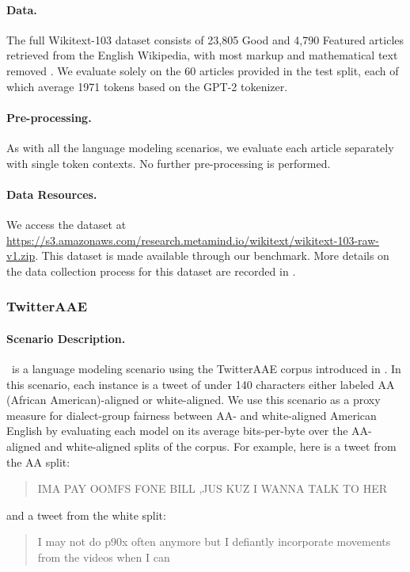 \paragraph{Data.}
The full Wikitext-103 dataset consists of 23,805 Good and 4,790 Featured articles retrieved from the English Wikipedia, with most markup and mathematical text removed \citep{merity2016pointer}. We evaluate solely on the 60 articles provided in the test split, each of which average 1971 tokens based on the GPT-2 tokenizer.

\paragraph{Pre-processing.}
As with all the language modeling scenarios, we evaluate each article separately with single token contexts. No further pre-processing is performed.

\paragraph{Data Resources.} We access the dataset at \url{https://s3.amazonaws.com/research.metamind.io/wikitext/wikitext-103-raw-v1.zip}. This dataset is made available through our benchmark. More details on the data collection process for this dataset are recorded in \citet{merity2016pointer}.

\subsubsection{TwitterAAE}
\paragraph{Scenario Description.} \twitteraae~is a language modeling scenario using the TwitterAAE corpus introduced in \citet{blodgett2016}. In this scenario, each instance is a tweet of under 140 characters either labeled AA (African American)-aligned or white-aligned. We use this scenario as a proxy measure for dialect-group fairness between AA- and white-aligned American English by evaluating each model on its average bits-per-byte over the AA-aligned and white-aligned splits of the corpus. For example, here is a tweet from the AA split:
\begin{quote}
    IMA PAY OOMFS FONE BILL ,JUS KUZ I WANNA TALK TO HER
\end{quote}
and a tweet from the white split:
\begin{quote}
    I may not do p90x often anymore but I defiantly incorporate movements from the videos when I can
\end{quote}


